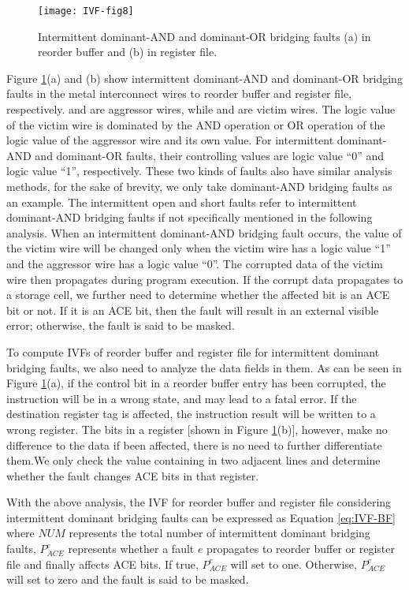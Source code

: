 \begin{figure}[t]
    \centering
    \texttt{[image: IVF-fig8]}\\
    \caption{Intermittent dominant-AND and dominant-OR bridging faults (a) in reorder buffer and (b) in register file.}
    \label{fig:IM-AND-OR}
\end{figure}


Figure \ref{fig:IM-AND-OR}(a) and (b) show intermittent dominant-AND and dominant-OR bridging faults in the metal interconnect wires to reorder buffer and register file, respectively. and are aggressor wires, while and are victim wires. The logic value of the victim wire is dominated by the AND operation or OR operation of the logic value of the aggressor wire and its own value. For intermittent dominant-AND and dominant-OR faults, their controlling values are logic value “0” and logic value “1”, respectively. These two kinds of faults also have similar analysis methods, for the sake of brevity, we only take dominant-AND bridging faults as an example. The intermittent open and short faults refer to intermittent dominant-AND bridging faults if not specifically mentioned in the following analysis. When an intermittent dominant-AND bridging fault occurs, the value of the victim wire will be changed only when the victim wire has a logic value “1” and the aggressor wire has a logic value “0”. The corrupted data of the victim wire then propagates during program execution. If the corrupt data propagates to a storage cell, we further need to determine whether the affected bit is an ACE bit or not. If it is an ACE bit, then the fault will result in an external visible error; otherwise, the fault is said to be masked. 

To compute IVFs of reorder buffer and register file for intermittent dominant bridging faults, we also need to analyze the data fields in them. As can be seen in Figure \ref{fig:IM-AND-OR}(a), if the control bit in a reorder buffer entry has been corrupted, the instruction will be in a wrong state, and may lead to a fatal error. If the destination register tag is affected, the instruction result will be written to a wrong register. The bits in a register [shown in Figure \ref{fig:IM-AND-OR}(b)], however, make no difference to the data if been affected, there is no need to further differentiate them.We only check the value containing in two adjacent lines and determine whether the fault changes ACE bits in that register. 

With the above analysis, the IVF for reorder buffer and register file considering intermittent dominant bridging faults can be expressed as Equation \ref{eq:IVF-BF} where $NUM$ represents the total number of intermittent dominant bridging faults, $P_{ACE}^{e}$ represents whether a fault $e$ propagates to reorder buffer or register file and finally affects ACE bits. If true, $P_{ACE}^{e}$ will set to one. Otherwise, $P_{ACE}^{e}$ will set to zero and the fault is said to be masked.

